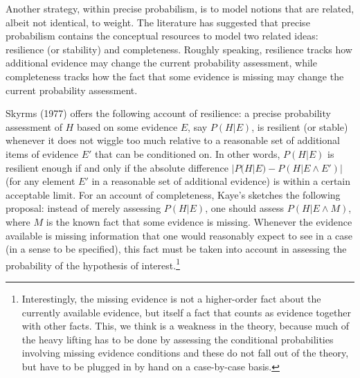\documentclass[
  10pt,
  dvipsnames,enabledeprecatedfontcommands]{scrartcl}
\begin{document}
Another strategy, within precise probabilism, is to model notions that
are related, albeit not identical, to weight. The literature has
suggested that precise probabilism contains the conceptual resources to
model two related ideas: resilience (or stability) and completeness.
Roughly speaking, resilience tracks how additional evidence may change
the current probability assessment, while completeness tracks how the
fact that some evidence is missing may change the current probability
assessment.

Skyrms (1977) offers the following account of resilience: a precise
probability assessment of \(H\) based on some evidence \(E\), say
\(P(H \vert E)\), is resilient (or stable) whenever it does not wiggle
too much relative to a reasonable set of additional items of evidence
\(E'\) that can be conditioned on. In other words, \(P(H \vert E)\) is
resilient enough if and only if the absolute difference
\(| P(H | E) - P(H \vert E \wedge E')|\) (for any element \(E'\) in a
reasonable set of additional evidence) is within a certain acceptable
limit. For an account of completeness, Kaye's sketches the following
proposal: instead of merely assessing
\(P(H \vert E)\), one should assess \(P(H \vert E \wedge M)\), where
\(M\) is the known fact that some evidence is missing. Whenever the
evidence available is missing information that one would reasonably
expect to see in a case (in a sense to be specified), this fact must be
taken into account in assessing the probability of the hypothesis of
interest.\footnote{Interestingly, the missing evidence is not a
  higher-order fact about the currently available evidence, but itself a
  fact that counts as evidence together with other facts. This, we think
  is a weakness in the theory, because much of the heavy lifting has to
  be done by assessing the conditional probabilities involving missing
  evidence conditions and these do not fall out of the theory, but have
  to be plugged in by hand on a case-by-case basis.}
\end{document}
